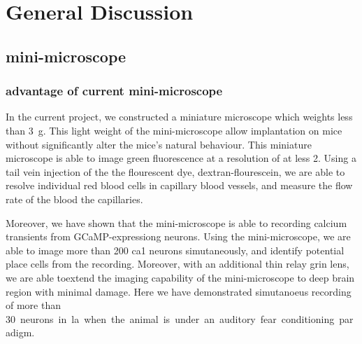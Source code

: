 \chapter{General Discussion}
\begin{comment}
\section{Summary of result}
\subsection{Summary of result}
\subsubsection{Hyperactivity}
\subsubsection{Cellular freezing encoding}
\subsubsection{Network freezing encoding}
\end{comment}
\section{mini-microscope}
\subsection{advantage of current mini-microscope}
In the current project, we constructed a miniature microscope which weights less than \SI{3}{\gram}. This light weight of the mini-microscope allow implantation on mice without significantly alter the mice's natural behaviour.  This miniature microscope is able to image green fluorescence at a resolution of at less \SI{2}{\micrometer}. Using a tail vein injection of the the flourescent dye, dextran-flourescein, we are able to resolve individual red blood cells in capillary blood vessels, and measure the flow rate of the blood the capillaries. 

Moreover, we have shown that the mini-microscope is able to recording calcium transients from GCaMP-expressiong neurons. Using the mini-microscope, we are able to image more than \num{200} \gls{ca1} neurons simutaneously, and identify potential place cells from the recording. Moreover, with an additional thin relay \gls{grin} lens, we are able toextend the imaging capability of the mini-microscope to deep brain region with minimal damage. Here we have demonstrated simutanoeus recording of more than \SI{30} neurons in \gls{la} when the animal is under an auditory fear conditioning paradigm. 

